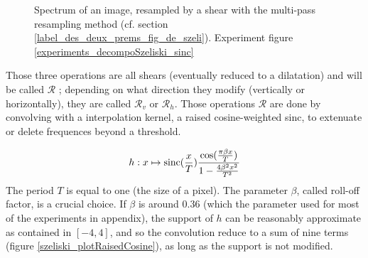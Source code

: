 \begin{figure}
		\caption{Spectrum of an image, resampled by a shear with the multi-pass resampling method (cf. section \ref{label_des_deux_prems_fig_de_szeli}). Experiment figure \ref{experiments_decompoSzeliski_sinc} }
		\label{szeliski_decompoSzeliski}
	\end{figure}
	
	
	Those three operations are all shears (eventually reduced to a dilatation) and will be called $\mathcal R$ ; depending on what direction they modify (vertically or horizontally), 	they are called $\mathcal R_v$ or $\mathcal R_h$. Those operations $\mathcal R$ are done by convolving with a interpolation kernel, a raised cosine-weighted sinc, to extenuate or delete frequences beyond a threshold.
	
	\begin{equation}
	h : x \mapsto \operatorname{sinc}(\frac{x}{T})\frac{\cos(\frac{\pi\beta x}{T})}{1-\frac{4\beta^2x^2}{T^2}}
	\label{szeliski_definition_raisedCosineWeightedSinc}
	\end{equation}
	The period $T$ is equal to one (the size of a pixel).
	The parameter $\beta$, called roll-off factor, is a crucial choice. If $\beta$ is around $0.36$ (which the parameter used for most of the experiments in appendix), the support of $h$ can be reasonably approximate as contained in $[-4,4]$, and so the convolution reduce to a sum of nine terms (figure \ref{szeliski_plotRaisedCosine}), as long as the support is not modified.
	
